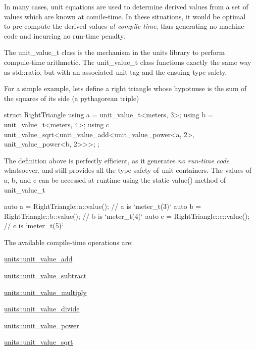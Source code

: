 In many cases, unit equations are used to determine derived values from a set of values which are known at comile-\/time. In these situations, it would be optimal to pre-\/compute the derived values {\itshape at compile time}, thus generating no machine code and incurring no run-\/time penalty.

The {\ttfamily unit\+\_\+value\+\_\+t} class is the mechanism in the units library to perform compule-\/time arithmetic. The {\ttfamily unit\+\_\+value\+\_\+t} class functions exactly the same way as {\ttfamily std\+::ratio}, but with an associated unit tag and the ensuing type safety.

For a simple example, let\textquotesingle{}s define a right triangle whose hypotnuse is the sum of the squares of its side (a pythagorean triple) \begin{DoxyVerb}struct RightTriangle
{
    using a = unit_value_t<meters, 3>;
    using b = unit_value_t<meters, 4>;
    using c = unit_value_sqrt<unit_value_add<unit_value_power<a, 2>, unit_value_power<b, 2>>>;
};
\end{DoxyVerb}


The definition above is perfectly efficient, as it generates {\itshape no run-\/time code} whatsoever, and still provides all the type safety of unit containers. The values of {\ttfamily a}, {\ttfamily b}, and {\ttfamily c} can be accessed at runtime using the static {\ttfamily value()} method of {\ttfamily unit\+\_\+value\+\_\+t} \begin{DoxyVerb}auto a = RightTriangle::a::value(); // a is `meter_t(3)`
auto b = RightTriangle::b::value(); // b is `meter_t(4)`
auto c = RightTriangle::c::value(); // c is `meter_t(5)`
\end{DoxyVerb}


The available compile-\/time operations are\+:
\begin{DoxyItemize}
\item {\ttfamily \hyperlink{structunits_1_1unit__value__add}{units\+::unit\+\_\+value\+\_\+add}}
\item {\ttfamily \hyperlink{structunits_1_1unit__value__subtract}{units\+::unit\+\_\+value\+\_\+subtract}}
\item {\ttfamily \hyperlink{structunits_1_1unit__value__multiply}{units\+::unit\+\_\+value\+\_\+multiply}}
\item {\ttfamily \hyperlink{structunits_1_1unit__value__divide}{units\+::unit\+\_\+value\+\_\+divide}}
\item {\ttfamily \hyperlink{structunits_1_1unit__value__power}{units\+::unit\+\_\+value\+\_\+power}}
\item {\ttfamily \hyperlink{structunits_1_1unit__value__sqrt}{units\+::unit\+\_\+value\+\_\+sqrt}}
\end{DoxyItemize}

